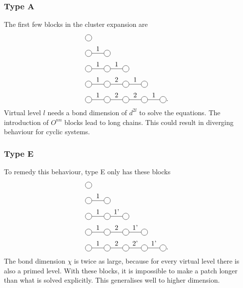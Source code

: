 \documentclass[twocolumn]{article}
\newcounter{a}
\newcounter{b}
\begin{document}
\subsubsection{Type A}
The first few blocks in the cluster expansion are
\begin{subequations}
    \begin{align}
         & \mpob{1}{ {,}  }{}{}{}{{,,}}                      \\
         & \mpob{2}{ {,"1",}  }{}{}{}{{,,}}                  \\
         & \mpob{3}{ {,"1","1",}  }{}{}{}{{,,,}}             \\
         & \mpob{4}{ {,"1","2","1",}  }{}{}{}{{,,,,,}}       \\
         & \mpob{5}{ {,"1","2","2","1",}  }{}{}{}{{,,,,,}} .
    \end{align}
\end{subequations}
Virtual level $l$ needs a bond dimension of $d^{2 l}$ to solve the equations.  The introduction of $O^{n n}$ blocks lead to long chains. This could result in diverging behaviour for cyclic systems.

\subsubsection{Type E}
To remedy this behaviour, type E only has these blocks
\begin{subequations}
    \begin{align}
         & \mpob{1}{ {,}  }{}{}{}{{,,}}                       \\
         & \mpob{2}{ {,"1",}  }{}{}{}{{,,}}                   \\
         & \mpob{3}{ {,"1","1'",}  }{}{}{}{{,,,}}             \\
         & \mpob{4}{ {,"1","2","1'",}  }{}{}{}{{,,,,,}}       \\
         & \mpob{5}{ {,"1","2","2'","1'",}  }{}{}{}{{,,,,,}}.
    \end{align}
\end{subequations}
The bond dimension $\chi$ is twice as large, because for every virtual level there is also a primed level. With these blocks, it is impossible to make a patch longer than what is solved explicitly. This generalises well to higher dimension.
\end{document}
